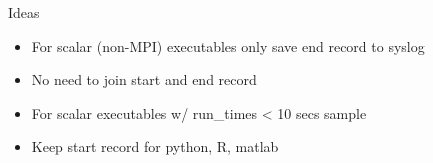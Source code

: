 \documentclass{beamer}
\begin{document}
\begin{frame}{Ideas}
  \begin{itemize}
    \item For scalar (non-MPI) executables only save end record to
      syslog
    \item No need to join start and end record
    \item For scalar executables w/ run_times < 10 secs sample 
    \item Keep start record for python, R, matlab
  \end{itemize}
\end{frame}
\end{document}
